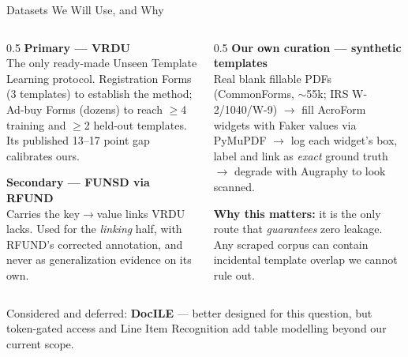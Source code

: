 \documentclass[aspectratio=169, 11pt]{beamer}
\begin{document}
\begin{frame}{Datasets We Will Use, and Why}
  \begin{columns}[T]
    \begin{column}{0.5\textwidth}
      \textbf{Primary — VRDU}\\
      {\footnotesize The only ready-made Unseen Template Learning protocol. Registration Forms
      (3 templates) to establish the method; Ad-buy Forms (dozens) to reach $\geq$4 training and
      $\geq$2 held-out templates. Its published 13--17 point gap calibrates ours.}
      \medskip

      \textbf{Secondary — FUNSD via RFUND}\\
      {\footnotesize Carries the key$\to$value links VRDU lacks. Used for the \emph{linking} half,
      with RFUND's corrected annotation, and never as generalization evidence on its own.}
    \end{column}
    \begin{column}{0.5\textwidth}
      \textbf{Our own curation — synthetic templates}\\
      {\footnotesize Real blank fillable PDFs (CommonForms, $\sim$55k; IRS W-2/1040/W-9)
      $\to$ fill AcroForm widgets with Faker values via PyMuPDF $\to$ log each widget's box,
      label and link as \emph{exact} ground truth $\to$ degrade with Augraphy to look scanned.}
      \medskip

      {\footnotesize\textbf{Why this matters:} it is the only route that \emph{guarantees} zero
      leakage. Any scraped corpus can contain incidental template overlap we cannot rule out.}
    \end{column}
  \end{columns}

  \medskip
  {\footnotesize\color{muted}
  Considered and deferred: \textbf{DocILE} — better designed for this question, but token-gated
  access and Line Item Recognition add table modelling beyond our current scope.}
\end{frame}
\end{document}
